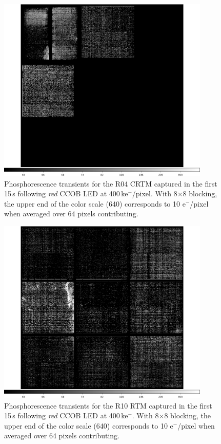 \begin{figure}[!htbp]
\centering
\includegraphics[width=0.9\textwidth]{figures/phosphorescence-survey/itl_fluor_R04_0-19_rb1_log.png}
\caption{Phosphorescence transients for the R04 CRTM captured in the first 15\,s following {\it red} CCOB LED at 400\,ke$^-$/pixel. With 8$\times$8 blocking, the upper end of the color scale (640) corresponds to 10 e$^-$/pixel when averaged over 64 pixels contributing.}
\label{fig:phos:R04}
\end{figure}

\begin{figure}[!htbp]
\centering
\includegraphics[width=0.9\textwidth]{figures/phosphorescence-survey/itl_fluor_R10_0-19_rb1_log.png}
\caption{Phosphorescence transients for the R10 RTM captured in the first 15\,s following {\it red} CCOB LED at 400\,ke$^-$. With 8$\times$8 blocking, the upper end of the color scale (640) corresponds to 10 e$^-$/pixel when averaged over 64 pixels contributing.}
\label{fig:phos:R10}
\end{figure}

